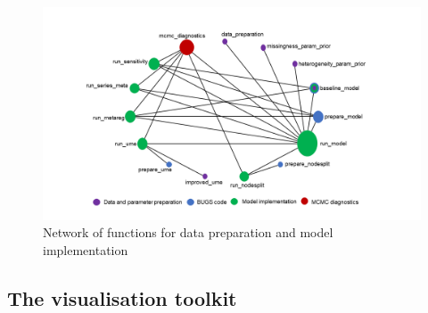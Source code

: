 \begin{figure}
\includegraphics[width=1\linewidth,height=0.3\textheight]{network_models} \caption{Network of functions for data preparation and model implementation}\label{fig:network-models}
\end{figure}

\hypertarget{the-visualisation-toolkit}{%
\subsection{The visualisation toolkit}\label{the-visualisation-toolkit}}

